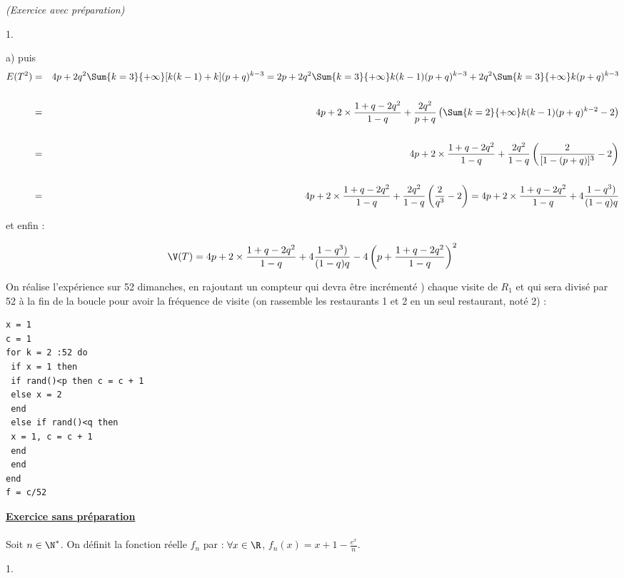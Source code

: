 \documentclass[11pt]{article}%
\begin{document}
\begin{exercice}{\it (Exercice avec préparation)}
\begin{noliste}{1.}
\begin{noliste}{a)}
 puis
 \begin{eqnarray*}
 E ( T^{2} ) & = & 4 p + 2 q^{2} \Sum{k = 3}{+ \infty} [ k (k-1) + k ]
(p + q)^{k-3} = 2 p + 2 q^{2} \Sum{k = 3}{+ \infty} k (k-1) (p +
q)^{k-3} + 2 q^{2} \Sum{k = 3}{+ \infty} k (p + q)^{k-3} \\
\\
 & = & 4 p + 2 \times \frac{ 1 + q - 2 q^{2} }{ 1 - q } + \frac{ 2
q^{2} }{ p + q } \left( \Sum{k = 2}{+ \infty} k (k-1) (p + q)^{k-2} - 2
\right) \\
\\
 & = & 4 p + 2 \times \frac{ 1 + q - 2 q^{2} }{ 1 - q } + \frac{ 2
q^{2} }{ 1-q } \left( \frac{ 2 }{ [ 1 -(p + q) ]^{3} } - 2 \right) \\
\\
 & = & 4 p + 2 \times \frac{ 1 + q - 2 q^{2} }{ 1 - q } + \frac{ 2
q^{2} }{ 1-q } \left( \frac{ 2 }{ q^{3} } - 2 \right) = 4 p + 2 \times
\frac{ 1 + q - 2 q^{2} }{ 1 - q } + 4 \frac{ 1 - q^{3} ) }{ (1-q) q }
 \end{eqnarray*}

 et enfin :
 
\[
 \V( T ) = 4 p + 2 \times \frac{ 1 + q - 2 q^{2} }{ 1 - q } + 4 \frac{
1 - q^{3} ) }{ (1-q) q } - 4 \left( p + \frac{ 1 + q - 2 q^{2} }{ 1- q
} \right)^{2} 
\]
 

 \end{noliste}

 \item On réalise l'expérience sur 52 dimanches, en rajoutant un
compteur qui devra être incrémenté ) chaque visite de $R_{1}$ et qui
sera divisé par 52 à la fin de la boucle pour avoir la fréquence de
visite (on rassemble les restaurants 1 et 2 en un seul restaurant, noté
2) : 

\begin{verbatim}
x = 1
c = 1
for k = 2 :52 do
 if x = 1 then 
 if rand()<p then c = c + 1
 else x = 2
 end
 else if rand()<q then
 x = 1, c = c + 1
 end
 end
end
f = c/52
\end{verbatim}

 \end{noliste}

 \noindent \textbf{\underline{Exercice sans préparation}} \\
\\
 Soit $n \in \N^*$. On définit la fonction réelle $f_{n}$ par :
$\forall x \in \R$, $f_{n} (x) = x + 1 - \frac{ e^{x} }{ n }$.
 \begin{noliste}{1.}
 \setlength{\itemsep}{4mm}


\end{noliste}
\end{exercice}
\end{document}
